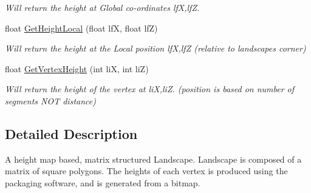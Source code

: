 \begin{DoxyCompactItemize}
\begin{DoxyCompactList}\small\item\em Will return the height at Global co-\/ordinates lfX,lfZ. \end{DoxyCompactList}\item 
\hypertarget{classc_landscape_acdb3f590236a85b1423acc47f064e9b7}{
float \hyperlink{classc_landscape_acdb3f590236a85b1423acc47f064e9b7}{GetHeightLocal} (float lfX, float lfZ)}
\label{classc_landscape_acdb3f590236a85b1423acc47f064e9b7}

\begin{DoxyCompactList}\small\item\em Will return the height at the Local position lfX,lfZ (relative to landscapes corner) \end{DoxyCompactList}\item 
\hypertarget{classc_landscape_a7642e8b5062010778a1ad8913077a661}{
float \hyperlink{classc_landscape_a7642e8b5062010778a1ad8913077a661}{GetVertexHeight} (int liX, int liZ)}
\label{classc_landscape_a7642e8b5062010778a1ad8913077a661}

\begin{DoxyCompactList}\small\item\em Will return the height of the vertex at liX,liZ. (position is based on number of segments NOT distance) \end{DoxyCompactList}\end{DoxyCompactItemize}


\subsection{Detailed Description}
A height map based, matrix structured Landscape. Landscape is composed of a matrix of square polygons. The heights of each vertex is produced using the packaging software, and is generated from a bitmap. 